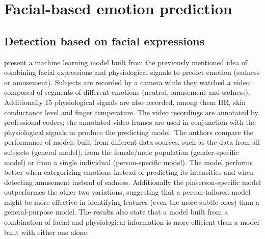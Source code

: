 \section{Facial-based emotion prediction}

\subsection{Detection based on facial expressions}

\textcite{bailenson2008real} present a machine learning model built from the previously mentioned idea of combining facial expressions and physiological signals to predict emotion (sadness or amusement). Subjects are recorded by a camera while they watched a video composed of segments of different emotions (neutral, amusement and sadness). Additionally 15 physiological signals are also recorded, among them HR, skin conductance level and finger temperature. The video recordings are annotated by professional coders; the annotated video frames are used in conjunction with the physiological signals to produce the predicting model. The authors compare the performance of models built from different data sources, such as the data from all subjects (general model), from the female/male population (gender-specific model) or from a single individual (person-specific model). The model performs better when categorizing emotions instead of predicting its intensities and when detecting amusement instead of sadness. Additionally the pinserson-specific model outperformes the other two variations, suggesting that a person-tailored model might be more effective in identifying features (even the more subtle ones) than a general-purpose model. The results also state that a model built from a combination of facial and physiological information is more efficient than a model built with either one alone.

